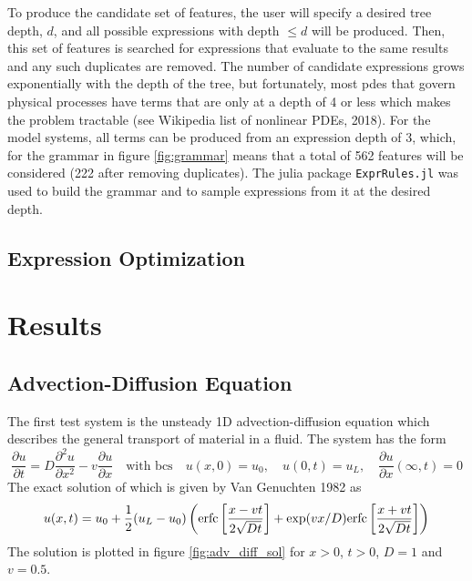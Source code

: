 \documentclass{article}
\begin{document}
To produce the candidate set of features, the user will specify a desired tree depth, $d$, and all possible expressions with depth $\leq d$ will be produced. Then, this set of features is searched for expressions that evaluate to the same results and any such duplicates are removed. The number of candidate expressions grows exponentially with the depth of the tree, but fortunately, most pdes that govern physical processes have terms that are only at a depth of 4 or less which makes the problem tractable (see Wikipedia list of nonlinear PDEs, 2018). For the model systems, all terms can be produced from an expression depth of 3, which, for the grammar in figure \ref{fig:grammar} means that a total of 562 features will be considered (222 after removing duplicates). The julia package \verb|ExprRules.jl| was used to build the grammar and to sample expressions from it at the desired depth.

\subsection{Expression Optimization}



\section{Results}
\label{results}

\subsection{Advection-Diffusion Equation}

The first test system is the unsteady 1D advection-diffusion equation which describes the general transport of material in a fluid. The system has the form
\[ \frac{\partial u}{\partial t} = D\frac{\partial^2 u}{\partial x^2} - v \frac{\partial u}{\partial x} \quad \text{with bcs} \quad u(x,0) = u_0, \quad
u(0,t) = u_L, \quad
\frac{\partial u}{\partial x}(\infty, t) = 0 \]
The exact solution of which is given by Van Genuchten 1982 as
\[ u(x,t) = u_0 + \frac{1}{2}(u_L - u_0) \left({\rm erfc}\left[ \frac{x - vt}{2\sqrt{Dt}}\right] + {\rm exp}(vx/D) {\rm erfc}\left[ \frac{x + vt}{2\sqrt{Dt}}\right] \right) \]
The solution is plotted in figure \ref{fig:adv_diff_sol} for $x>0$, $t>0$, $D=1$ and $v=0.5$.
\end{document}
